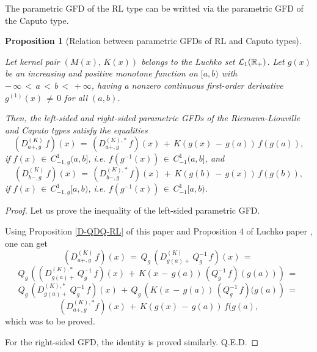 \documentclass[12pt]{article}
\newtheorem{Proposition}{Proposition}
\begin{document}
The parametric GFD of the RL type can be writted via 
the parametric GFD of the Caputo type. 


\begin{Proposition}[Relation between parametric GFDs of RL and Caputo types] 
\label{RL-Caputo}

Let kernel pair $(M(x), \, K(x))$ belongs to the Luchko set ${\cal L}_{1}(\mathbb{R}_{+})$.
Let $g(x)$ be an increasing and positive monotone function on $[a, b)$ 
with $ - \, \infty \, < \, a \, < \, b \, < \, +\infty$, 
having a nonzero continuous first-order derivative $g^{(1)}(x) \, \ne \, 0$ for all $(a,b)$.

Then, the left-sided and right-sided parametric GFDs of the Riemann-Liouville and Caputo types satisfy the equalities
\begin{equation}
(D^{(K)}_{a+,g} \, f)(x) \, = \, 
(D^{(K),*}_{a+,g} \, f)(x) \, + \, 
K(g(x) \, - \, g(a)) \, f(g(a)) , 
\end{equation}
if $f(x) \, \in \, C^{1}_{-1,g}(a,b]$, i.e. 
$f(g^{-1}(x)) \, \in \, C^{1}_{-1}(a,b]$, and 
\begin{equation}
(D^{(K)}_{b-,g} \, f)(x) \, = \, 
(D^{(K),*}_{b-,g} \, f)(x) \, + \, 
K(g(b) \, - \, g(x)) \, f(g(b)) , 
\end{equation}
if $f(x) \, \in \, C^{1}_{-1,g}[a,b)$, i.e. 
$f(g^{-1}(x)) \, \in \, C^{1}_{-1}[a,b)$. 
\end{Proposition}

\begin{proof}
Let us prove the inequality of the left-sided parametric GFD.

Using Proposition \ref{D-QDQ-RL} of this paper and Proposition 4 of Luchko paper \cite{Luchko2023}, one can get
\[
(D^{(K)}_{a+,g} \, f)(x) \, = \, 
Q_g \, \left(D^{(K)}_{g(a)+} \, Q^{-1}_g \, f \right)(x) \, = \, 
\]
\[
Q_g \, \left( 
(D^{(K),*}_{g(a)+} \, Q^{-1}_g \, f)(x) 
\, + \, K(x \, - \, g(a)) \, (Q^{-1}_g \, f)(g(a))
\right) \, = \, 
\]
\[
Q_g \, \left(D^{(K),*}_{g(a)+} \, Q^{-1}_g \, f \right)(x) \, + \, 
Q_g \, \left( K(x \, - \, g(a)) \, (Q^{-1}_g \, f)(g(a) \right) 
\, = \, 
\]
\[
(D^{(K),*}_{a+,g} f)(x)\, + \, 
K(g(x) \, - \, g(a)) \, f(g(a) ,
\]
which was to be proved. 

For the right-sided GFD, the identity is proved similarly.
Q.E.D.
\end{proof}

\end{document}
